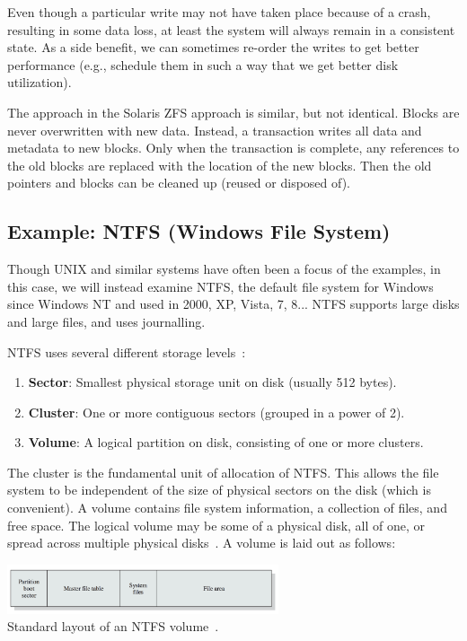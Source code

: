 Even though a particular write may not have taken place because of a crash, resulting in some data loss, at least the system will always remain in a consistent state. As a side benefit, we can sometimes re-order the writes to get better performance (e.g., schedule them in such a way that we get better disk utilization). 

The approach in the Solaris ZFS approach is similar, but not identical. Blocks are never overwritten with new data. Instead, a transaction writes all data and metadata to new blocks. Only when the transaction is complete, any references to the old blocks are replaced with the location of the new blocks. Then the old pointers and blocks can be cleaned up (reused or disposed of). 

\subsection*{Example: NTFS (Windows File System)}
Though UNIX and similar systems have often been a focus of the examples, in this case, we will instead examine NTFS, the default file system for Windows since Windows NT and used in 2000, XP, Vista, 7, 8... NTFS supports large disks and large files, and uses journalling. 

NTFS uses several different storage levels~\cite{osi}:

\begin{enumerate}
	\item \textbf{Sector}: Smallest physical storage unit on disk (usually 512 bytes).
	\item \textbf{Cluster}: One or more contiguous sectors (grouped in a power of 2).
	\item \textbf{Volume}: A logical partition on disk, consisting of one or more clusters. 
\end{enumerate}

The cluster is the fundamental unit of allocation of NTFS. This allows the file system to be independent of the size of physical sectors on the disk (which is convenient). A volume contains file system information, a collection of files, and free space. The logical volume may be some of a physical disk, all of one, or spread across multiple physical disks~\cite{osi}. A volume is laid out as follows:

\begin{center}
	\includegraphics[width=0.6\textwidth]{images/ntfs-volume.png}\\
	Standard layout of an NTFS volume~\cite{osi}.
\end{center}


